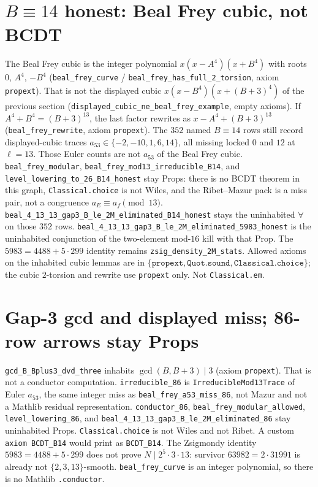 \documentclass[12pt]{amsart}
\begin{document}
\section{$B\equiv 14$ honest: Beal Frey cubic, not BCDT}
The Beal Frey cubic is the integer polynomial
$x(x-A^4)(x+B^4)$ with roots $0$, $A^4$, $-B^4$
(\texttt{beal\_frey\_curve} /
\texttt{beal\_frey\_has\_full\_2\_torsion},
axiom \texttt{propext}).
That is not the displayed cubic
$x(x-B^4)(x+(B+3)^4)$ of the previous section
(\texttt{displayed\_cubic\_ne\_beal\_frey\_example},
empty axioms).
If $A^4+B^4=(B+3)^{13}$, the last factor
rewrites as $x-A^4+(B+3)^{13}$
(\texttt{beal\_frey\_rewrite}, axiom \texttt{propext}).
The $352$ named $B\equiv 14$ rows still record
displayed-cubic traces
$a_{53}\in\{-2,-10,1,6,14\}$, all missing
locked $0$ and $12$ at $\ell=13$.
Those Euler counts are not
$a_{53}$ of the Beal Frey cubic.
\texttt{beal\_frey\_modular},
\texttt{beal\_frey\_mod13\_irreducible\_B14},
and \texttt{level\_lowering\_to\_26\_B14\_honest}
stay Props: there is no BCDT theorem in this
graph, \texttt{Classical.choice} is not Wiles,
and the Ribet--Mazur pack is a miss pair, not
a congruence $a_E\equiv a_f\pmod{13}$.
\texttt{beal\_4\_13\_13\_gap3\_B\_le\_2M\_eliminated\_B14\_honest}
stays the uninhabited $\forall$ on those
$352$ rows.
\texttt{beal\_4\_13\_13\_gap3\_B\_le\_2M\_eliminated\_5983\_honest}
is the uninhabited conjunction of the
two-element mod-$16$ kill with that Prop.
The $5983=4488+5\cdot 299$ identity remains
\texttt{zsig\_density\_2M\_stats}.
Allowed axioms on the inhabited cubic lemmas
are in $\{\texttt{propext},\texttt{Quot.sound},\texttt{Classical.choice}\}$;
the cubic $2$-torsion and rewrite use
\texttt{propext} only.  Not \texttt{Classical.em}.

\section{Gap-3 gcd and displayed miss; 86-row arrows stay Props}
\texttt{gcd\_B\_Bplus3\_dvd\_three} inhabits
$\gcd(B,B+3)\mid 3$ (axiom \texttt{propext}).
That is not a conductor computation.
\texttt{irreducible\_86} is
\texttt{IrreducibleMod13Trace} of Euler
$a_{53}$, the same integer miss as
\texttt{beal\_frey\_a53\_miss\_86}, not Mazur
and not a Mathlib residual representation.
\texttt{conductor\_86},
\texttt{beal\_frey\_modular\_allowed},
\texttt{level\_lowering\_86}, and
\texttt{beal\_4\_13\_13\_gap3\_B\_le\_2M\_eliminated\_86}
stay uninhabited Props.
\texttt{Classical.choice} is not Wiles and not Ribet.
A custom \texttt{axiom BCDT\_B14} would print as
\texttt{BCDT\_B14}.
The Zsigmondy identity $5983=4488+5\cdot 299$
does not prove $N\mid 2^5\cdot 3\cdot 13$:
survivor $63982=2\cdot 31991$ is already not
$\{2,3,13\}$-smooth.
\texttt{beal\_frey\_curve} is an integer polynomial,
so there is no Mathlib \texttt{.conductor}.
\end{document}
